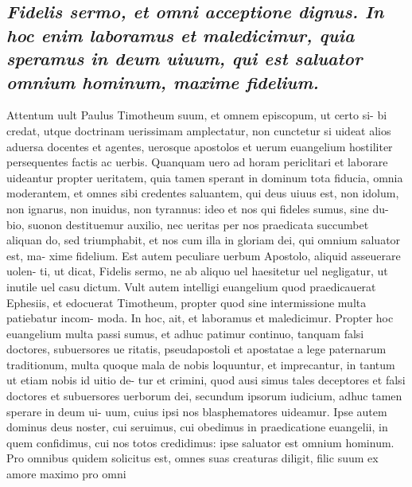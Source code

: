 \documentclass{article}
\begin{document}
\begin{pages}
\subsection*{\textit{Fidelis sermo, et omni acceptione dignus. In hoc enim laboramus et maledicimur, quia speramus in deum uiuum, qui est saluator omnium hominum, maxime fidelium. }}\pstart Attentum uult Paulus Timotheum suum, et omnem episcopum, ut certo si- bi credat, utque doctrinam uerissimam amplectatur, non cunctetur si uideat alios aduersa docentes et agentes, uerosque apostolos et uerum euangelium hostiliter persequentes factis ac uerbis. Quanquam uero ad horam periclitari et laborare uideantur propter ueritatem, quia tamen sperant in dominum tota fiducia, omnia moderantem, et omnes sibi credentes saluantem, qui deus uiuus est, non idolum, non ignarus, non inuidus, non tyrannus: ideo et nos qui fideles sumus, sine du- bio, suonon destituemur auxilio, nec ueritas per nos praedicata succumbet aliquan do, sed triumphabit, et nos cum illa in gloriam dei, qui omnium saluator est, ma- xime fidelium. Est autem peculiare uerbum Apostolo, aliquid asseuerare uolen- ti, ut dicat, Fidelis sermo, ne ab aliquo uel haesitetur uel negligatur, ut inutile uel casu dictum. Vult autem intelligi euangelium quod praedicauerat Ephesiis, et edocuerat Timotheum, propter quod sine intermissione multa patiebatur incom- moda. In hoc, ait, et laboramus et maledicimur. Propter hoc euangelium multa passi sumus, et adhuc patimur continuo, tanquam falsi doctores, subuersores ue ritatis, pseudapostoli et apostatae a lege paternarum traditionum, multa quoque mala de nobis loquuntur, et imprecantur, in tantum ut etiam nobis id uitio de- tur et crimini, quod ausi simus tales deceptores et falsi doctores et subuersores uerborum dei, secundum ipsorum iudicium, adhuc tamen sperare in deum ui- uum, cuius ipsi nos blasphematores uideamur. Ipse autem dominus deus noster, cui seruimus, cui obedimus in praedicatione euangelii, in quem confidimus, cui nos totos credidimus: ipse saluator est omnium hominum. Pro omnibus quidem solicitus est, omnes suas creaturas diligit, filic suum ex amore maximo pro omni  \pend

\end{pages}
\end{document}
